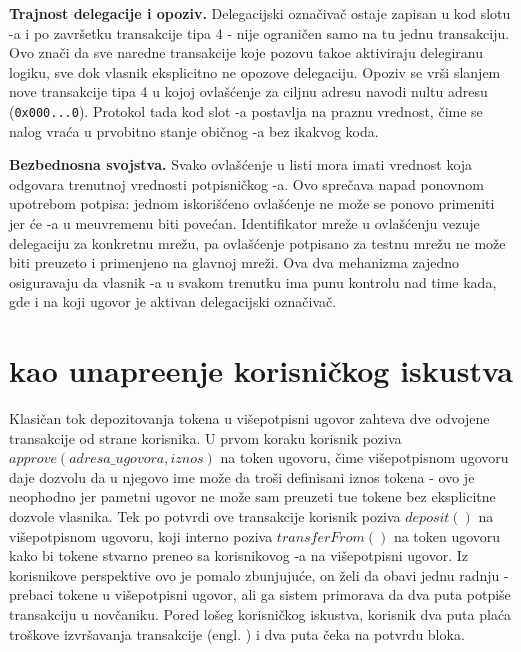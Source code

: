 \textbf{Trajnost delegacije i opoziv.} Delegacijski ozna\v civa\v c ostaje zapisan u kod slotu -a i po zavr\v setku transakcije tipa 4 - nije ograni\v cen samo na tu jednu transakciju. Ovo zna\v ci da sve naredne transakcije koje pozovu  tako\dj e aktiviraju delegiranu logiku, sve dok vlasnik eksplicitno ne opozove delegaciju. Opoziv se vr\v si slanjem nove transakcije tipa 4 u kojoj ovla\v s\' cenje za ciljnu adresu navodi nultu adresu (\texttt{0x000...0}). Protokol tada kod slot -a postavlja na praznu vrednost, \v cime se nalog vra\' ca u prvobitno stanje obi\v cnog -a bez ikakvog koda.

\textbf{Bezbednosna svojstva.} Svako ovla\v s\' cenje u listi mora imati  vrednost koja odgovara trenutnoj  vrednosti potpisni\v ckog -a. Ovo spre\v cava napad ponovnom upotrebom potpisa: jednom iskori\v s\' ceno ovla\v s\' cenje ne mo\v ze se ponovo primeniti jer \' ce  -a u me\dj uvremenu biti pove\' can. Identifikator mre\v ze u ovla\v s\' cenju vezuje delegaciju za konkretnu  mre\v zu, pa ovla\v s\' cenje potpisano za  testnu mre\v zu ne mo\v ze biti preuzeto i primenjeno na glavnoj mre\v zi. Ova dva mehanizma zajedno osiguravaju da vlasnik -a u svakom trenutku ima punu kontrolu nad time kada, gde i na koji ugovor je aktivan delegacijski ozna\v civa\v c.

\section{ kao unapre\dj enje korisni\v ckog iskustva}

Klasi\v can tok depozitovanja  tokena u vi\v sepotpisni ugovor zahteva dve odvojene transakcije od strane korisnika. U prvom koraku korisnik poziva $approve(adresa\_ugovora, iznos)$ na  token ugovoru, \v cime vi\v sepotpisnom ugovoru daje dozvolu da u njegovo ime mo\v ze da tro\v si definisani iznos tokena - ovo je neophodno jer pametni ugovor ne mo\v ze sam preuzeti tu\dj e tokene bez eksplicitne dozvole vlasnika. Tek po potvrdi ove transakcije korisnik poziva $deposit()$ na vi\v sepotpisnom ugovoru, koji interno poziva $transferFrom()$ na token ugovoru kako bi tokene stvarno preneo sa korisnikovog -a na vi\v sepotpisni ugovor. Iz korisnikove perspektive ovo je pomalo zbunjuju\' ce, on \v zeli da obavi jednu radnju - prebaci tokene u vi\v sepotpisni ugovor, ali ga sistem primorava da dva puta potpi\v se transakciju u nov\v caniku. Pored lo\v seg korisni\v ckog iskustva, korisnik dva puta pla\' ca tro\v skove izvr\v savanja transakcije (engl. ) i dva puta \v ceka na potvrdu bloka.

